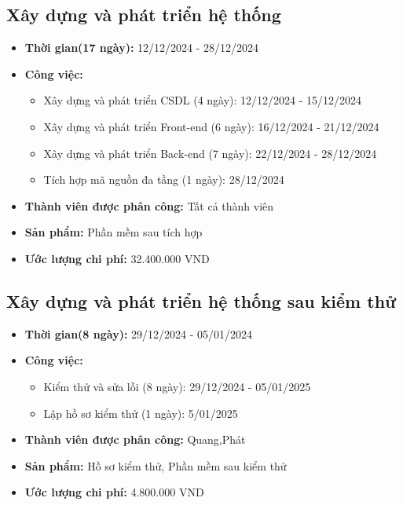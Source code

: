 \subsection{Xây dựng và phát triển hệ thống}  
\begin{itemize}
    \item \textbf{Thời gian(17 ngày):} 12/12/2024 - 28/12/2024
    \item \textbf{Công việc:}
    \begin{itemize}
        \item Xây dựng và phát triển CSDL (4 ngày): 12/12/2024 - 15/12/2024
        \item Xây dựng và phát triển Front-end (6 ngày): 16/12/2024 - 21/12/2024
        \item Xây dựng và phát triển Back-end (7 ngày): 22/12/2024 - 28/12/2024
        \item Tích hợp mã nguồn đa tầng (1 ngày): 28/12/2024
    \end{itemize}
    \item \textbf{Thành viên được phân công:} Tất cả thành viên
    \item \textbf{Sản phẩm:} Phần mềm sau tích hợp 
    \item \textbf{Ước lượng chi phí:} 32.400.000 VND
\end{itemize}
\subsection{Xây dựng và phát triển hệ thống sau kiểm thử}
\begin{itemize}
    \item \textbf{Thời gian(8 ngày):} 29/12/2024 - 05/01/2024
    \item \textbf{Công việc:}
    \begin{itemize}
        \item Kiểm thử và sửa lỗi (8 ngày): 29/12/2024 - 05/01/2025 
        \item Lập hồ sơ kiểm thử (1 ngày): 5/01/2025
    \end{itemize}
    \item \textbf{Thành viên được phân công:} Quang,Phát
    \item \textbf{Sản phẩm:} Hồ sơ kiểm thử, Phần mềm sau kiểm thử
    \item \textbf{Ước lượng chi phí:} 4.800.000 VND
\end{itemize}
